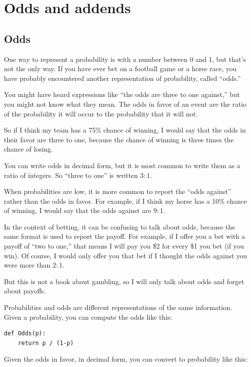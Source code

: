 \documentclass[12pt]{book}
\begin{document}
\chapter{Odds and addends}

\section{Odds}

One way to represent a probability is with a number between
0 and 1, but that's not the only way.  If you have ever bet
on a football game or a horse race, you have probably encountered
another representation of probability, called ``odds.''

You might have heard expressions like ``the odds are
three to one against,'' but you might not know what they mean.  
The odds in favor of an event are the ratio of the probability
it will occur to the probability that it will not.

So if I think my team has a 75\% chance of winning, I would
say that the odds in their favor are three to one, because
the chance of winning is three times the chance of losing.

You can write odds in decimal form, but it is most common to
write them as a ratio of integers.  So ``three to one'' is
written $3:1$.

When probabilities are low, it is more common to report the
``odds against'' rather than the odds in favor.  For
example, if I think my horse has a 10\% chance of winning,
I would say that the odds against are $9:1$.

In the context of betting, it can be confusing to talk about
odds, because the same format is used to report the payoff.
For example, if I offer you a bet with a payoff of ``two to one,''
that means I will pay you \$2 for every \$1 you bet (if
you win).  Of course, I would only offer you that bet if
I thought the odds against you were more than $2:1$.

But this is not a book about gambling, so I will only talk about odds
and forget about payoffs.

Probabilities and odds are different representations of the
same information.  Given a probability, you can compute the
odds like this:

\begin{verbatim}
def Odds(p):
    return p / (1-p)
\end{verbatim}

Given the odds in favor, in decimal form, you can convert to
probability like this:
\end{document}
